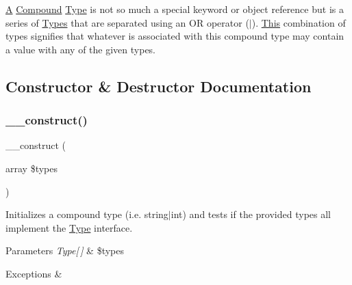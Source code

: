 \mbox{\hyperlink{class_a}{A}} \mbox{\hyperlink{classphp_documentor_1_1_reflection_1_1_types_1_1_compound}{Compound}} \mbox{\hyperlink{interfacephp_documentor_1_1_reflection_1_1_type}{Type}} is not so much a special keyword or object reference but is a series of \mbox{\hyperlink{namespacephp_documentor_1_1_reflection_1_1_types}{Types}} that are separated using an OR operator ({\ttfamily $\vert$}). \mbox{\hyperlink{classphp_documentor_1_1_reflection_1_1_types_1_1_this}{This}} combination of types signifies that whatever is associated with this compound type may contain a value with any of the given types. 

\subsection{Constructor \& Destructor Documentation}
\mbox{\label{classphp_documentor_1_1_reflection_1_1_types_1_1_compound_a66c0bd71b182b3e6d120705f4e011f0c}} 
\subsubsection{\texorpdfstring{\+\_\+\+\_\+construct()}{\_\_construct()}}
{\footnotesize\ttfamily \+\_\+\+\_\+construct (\begin{DoxyParamCaption}\item[{array}]{\$types }\end{DoxyParamCaption})}

Initializes a compound type (i.\+e. {\ttfamily string$\vert$int}) and tests if the provided types all implement the \mbox{\hyperlink{interfacephp_documentor_1_1_reflection_1_1_type}{Type}} interface.


\begin{DoxyParams}{Parameters}
{\em Type\mbox{[}$\,$\mbox{]}} & \$types \\
\hline
\end{DoxyParams}

\begin{DoxyExceptions}{Exceptions}
{\em } & \\
\hline
\end{DoxyExceptions}


